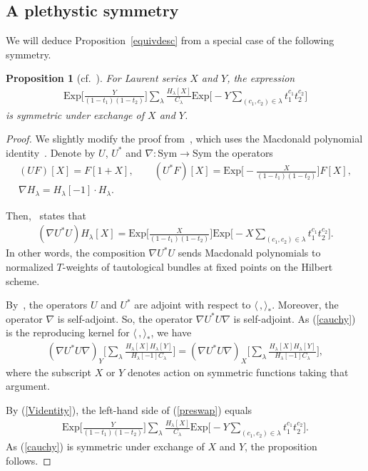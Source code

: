 \documentclass[pdftex]{sigma}
\newtheorem{Proposition}[Theorem]{Proposition}
 { \theoremstyle{definition}
\newtheorem{Definition}[Theorem]{Definition}
\newtheorem{Note}[Theorem]{Note}
\newtheorem{Example}[Theorem]{Example}
\newtheorem{Remark}[Theorem]{Remark} }
\numberwithin{equation}{section}
\newcommand{\Sym}{\mathrm{Sym}}
\newcommand{\Exp}{\mathrm{Exp}}
\begin{document}
\subsection{A plethystic symmetry}
We will deduce Proposition~\ref{equivdesc} from a special case of the following symmetry.

\begin{Proposition}[{cf.~\cite[Section~7]{M}}]\label{Macsym}
For Laurent series $X$ and $Y$, the expression
\begin{align}\label{Macid}
\Exp\bigg[\frac{Y}{(1-t_1)(1-t_2)}\bigg]\sum_{\lambda}\frac{H_{\lambda}[X]}{C_{\lambda}} \Exp\biggl[{-}Y \sum_{(c_1,c_2)\in \lambda} t_1^{c_1}t_2^{c_2}\biggr]
\end{align}
is symmetric under exchange of $X$ and $Y$.
\end{Proposition}

\begin{proof} We slightly modify the proof from~\cite{M}, which uses the Macdonald polynomial identity~\cite[Theorem~I.3]{GHT}.
Denote by $U$, $U^*$ and $\nabla\colon \Sym\to \Sym$ the operators
\begin{gather*}
(UF)[X]=F[1+X], \qquad
(U^*F)[X]=\Exp \biggl[{-}\frac{X}{(1 - t_1)(1 - t_2)}\biggr] F[X], \\
\nabla H_{\lambda} =H_{\lambda}[-1]\cdot H_{\lambda}.
\end{gather*}

Then,~\cite[Theorem~I.3]{GHT} states that
\begin{align}\label{Videntity}
(\nabla U^*U)H_{\lambda}[X]=\Exp\bigg[\frac{X}{(1-t_1)(1-t_2)}\bigg] \Exp\biggl[{-}X \sum_{(c_1,c_2)\in \lambda} t_1^{c_1}t_2^{c_2}\biggr].
\end{align}
In other words, the composition $\nabla U^*U$ sends Macdonald polynomials to normalized $T$-weights of tautological bundles at fixed points on the Hilbert scheme.


By~\cite[Proposition 1.11b]{GHT}, the operators $U$ and $U^*$ are adjoint with respect to $\langle\,,\rangle_{*}$. Moreover, the operator $\nabla$ is self-adjoint. So, the operator $\nabla U^*U\nabla$ is self-adjoint. As (\ref{cauchy}) is the reproducing kernel for $\langle\,,\rangle_*$, we have
\begin{align}\label{preswap}
(\nabla U^* U\nabla)_{Y}\bigg[\sum_{\lambda} {\frac{H_{\lambda}[X] H_{\lambda}[Y]} {H_{\lambda}[-1]C_{\lambda}} }\bigg]=(\nabla U^*U\nabla)_{X}\bigg[\sum_{\lambda} {\frac{H_{\lambda}[X] H_{\lambda}[Y]} {H_{\lambda}[-1]C_{\lambda}} }\bigg],
\end{align}
where the subscript $X$ or $Y$ denotes action on symmetric functions taking that argument.

By (\ref{Videntity}), the left-hand side of (\ref{preswap}) equals
\begin{align*}%
\Exp\bigg[\frac{Y}{(1-t_1)(1-t_2)}\bigg]\sum_{\lambda}\frac{H_{\lambda}[X]}{C_{\lambda}}\Exp\bigg[{-}Y \sum_{(c_1,c_2)\in \lambda} t_1^{c_1}t_2^{c_2}\bigg].
\end{align*}
As (\ref{cauchy}) is symmetric under exchange of $X$ and $Y$, the proposition follows.
\end{proof}
\end{document}
